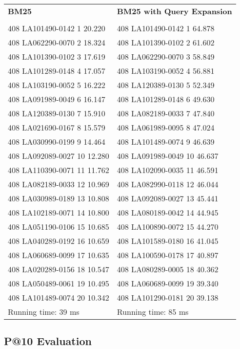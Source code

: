 \begin{tabular}{ l l }
\textbf{BM25} & \textbf{BM25 with Query Expansion}\\
\\
408 LA101490-0142 1 20.220 & 408 LA101490-0142 1 64.878\\
408 LA062290-0070 2 18.324 & 408 LA101390-0102 2 61.602\\
408 LA101390-0102 3 17.619 & 408 LA062290-0070 3 58.849\\
408 LA101289-0148 4 17.057 & 408 LA103190-0052 4 56.881\\
408 LA103190-0052 5 16.222 & 408 LA120389-0130 5 52.349\\
408 LA091989-0049 6 16.147 & 408 LA101289-0148 6 49.630\\
408 LA120389-0130 7 15.910 & 408 LA082189-0033 7 47.840\\
408 LA021690-0167 8 15.579 & 408 LA061989-0095 8 47.024\\
408 LA030990-0199 9 14.464 & 408 LA101489-0074 9 46.639\\
408 LA092089-0027 10 12.280 & 408 LA091989-0049 10 46.637\\
408 LA110390-0071 11 11.762 & 408 LA102090-0035 11 46.591\\
408 LA082189-0033 12 10.969 & 408 LA082990-0118 12 46.044\\
408 LA030989-0189 13 10.808 & 408 LA092089-0027 13 45.441\\
408 LA102189-0071 14 10.800 & 408 LA080189-0042 14 44.945\\
408 LA051190-0106 15 10.685 & 408 LA100890-0072 15 44.270\\
408 LA040289-0192 16 10.659 & 408 LA101589-0180 16 41.045\\
408 LA060689-0099 17 10.635 & 408 LA100590-0178 17 40.897\\
408 LA020289-0156 18 10.547 & 408 LA080289-0005 18 40.362\\
408 LA050489-0061 19 10.495 & 408 LA060689-0099 19 39.340\\
408 LA101489-0074 20 10.342 & 408 LA101290-0181 20 39.138\\
Running time: 39 ms & Running time: 85 ms\\
\end{tabular}

\newpage
\subsection*{P@10 Evaluation}

